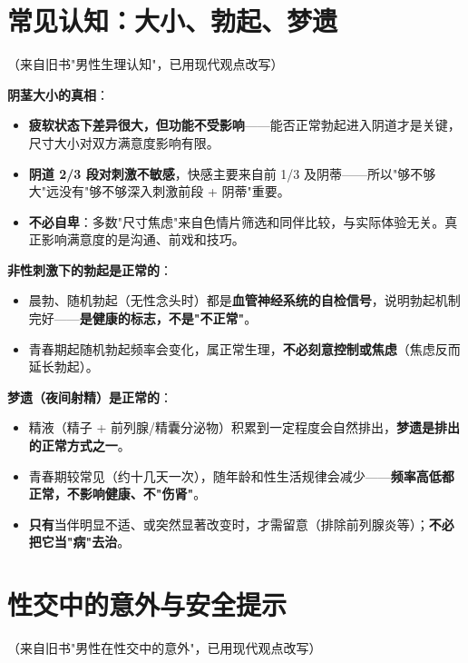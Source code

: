 \documentclass[12pt,UTF8,openany]{ctexbook}
\begin{document}
\section{常见认知：大小、勃起、梦遗}（来自旧书"男性生理认知"，已用现代观点改写）

\textbf{阴茎大小的真相}：
\begin{itemize}[leftmargin=2em,itemsep=0.3em]
  \item \textbf{疲软状态下差异很大，但功能不受影响}——能否正常勃起进入阴道才是关键，尺寸大小对双方满意度影响有限。
  \item \textbf{阴道 2/3 段对刺激不敏感}，快感主要来自前 1/3 及阴蒂——所以"够不够大"远没有"够不够深入刺激前段 + 阴蒂"重要。
  \item \textbf{不必自卑}：多数"尺寸焦虑"来自色情片筛选和同伴比较，与实际体验无关。真正影响满意度的是沟通、前戏和技巧。
\end{itemize}

\textbf{非性刺激下的勃起是正常的}：
\begin{itemize}[leftmargin=2em,itemsep=0.3em]
  \item 晨勃、随机勃起（无性念头时）都是\textbf{血管神经系统的自检信号}，说明勃起机制完好——\textbf{是健康的标志，不是"不正常"}。
  \item 青春期起随机勃起频率会变化，属正常生理，\textbf{不必刻意控制或焦虑}（焦虑反而延长勃起）。
\end{itemize}

\textbf{梦遗（夜间射精）是正常的}：
\begin{itemize}[leftmargin=2em,itemsep=0.3em]
  \item 精液（精子 + 前列腺/精囊分泌物）积累到一定程度会自然排出，\textbf{梦遗是排出的正常方式之一}。
  \item 青春期较常见（约十几天一次），随年龄和性生活规律会减少——\textbf{频率高低都正常，不影响健康、不"伤肾"}。
  \item \textbf{只有}当伴明显不适、或突然显著改变时，才需留意（排除前列腺炎等）；\textbf{不必把它当"病"去治}。
\end{itemize}

\section{性交中的意外与安全提示}（来自旧书"男性在性交中的意外"，已用现代观点改写）
\end{document}
